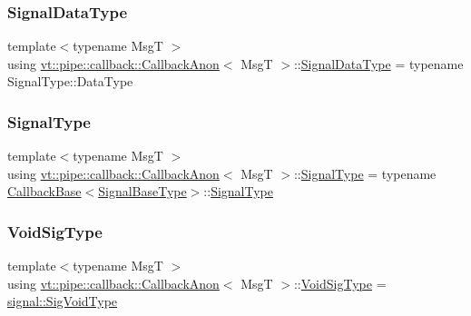 \subsubsection{\texorpdfstring{Signal\+Data\+Type}{SignalDataType}}
{\footnotesize\ttfamily template$<$typename MsgT $>$ \\
using \hyperlink{structvt_1_1pipe_1_1callback_1_1_callback_anon}{vt\+::pipe\+::callback\+::\+Callback\+Anon}$<$ MsgT $>$\+::\hyperlink{structvt_1_1pipe_1_1callback_1_1_callback_anon_ac503b95feb44bb0b60c1d69e1ed29074}{Signal\+Data\+Type} =  typename Signal\+Type\+::\+Data\+Type}

\mbox{\label{structvt_1_1pipe_1_1callback_1_1_callback_anon_a710e9366e47c727549714e568b622f85}} 
\subsubsection{\texorpdfstring{Signal\+Type}{SignalType}}
{\footnotesize\ttfamily template$<$typename MsgT $>$ \\
using \hyperlink{structvt_1_1pipe_1_1callback_1_1_callback_anon}{vt\+::pipe\+::callback\+::\+Callback\+Anon}$<$ MsgT $>$\+::\hyperlink{structvt_1_1pipe_1_1callback_1_1_callback_anon_a710e9366e47c727549714e568b622f85}{Signal\+Type} =  typename \hyperlink{structvt_1_1pipe_1_1callback_1_1_callback_base}{Callback\+Base}$<$\hyperlink{structvt_1_1pipe_1_1callback_1_1_callback_anon_a84629a45a0c53a8804a4fa68b6b4aaa7}{Signal\+Base\+Type}$>$\+::\hyperlink{structvt_1_1pipe_1_1callback_1_1_callback_anon_a710e9366e47c727549714e568b622f85}{Signal\+Type}}

\mbox{\label{structvt_1_1pipe_1_1callback_1_1_callback_anon_a37f2e8be7b6c014a2a33232b678a05cc}} 
\subsubsection{\texorpdfstring{Void\+Sig\+Type}{VoidSigType}}
{\footnotesize\ttfamily template$<$typename MsgT $>$ \\
using \hyperlink{structvt_1_1pipe_1_1callback_1_1_callback_anon}{vt\+::pipe\+::callback\+::\+Callback\+Anon}$<$ MsgT $>$\+::\hyperlink{structvt_1_1pipe_1_1callback_1_1_callback_anon_a37f2e8be7b6c014a2a33232b678a05cc}{Void\+Sig\+Type} =  \hyperlink{namespacevt_1_1pipe_1_1signal_acbe257d1ae44f20fa9fd9b6ed3057caf}{signal\+::\+Sig\+Void\+Type}}



